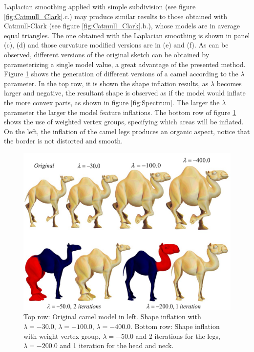 \documentclass[10pt, conference]{IEEEtran}
\begin{document}
Laplacian smoothing applied with simple subdivision (see figure \ref{fig:Catmull_Clark}.c.)
may produce similar results to those obtained with Catmull-Clark (see
figure \ref{fig:Catmull_Clark}.b.), whose models are in average equal
triangles. The one obtained with the Laplacian smoothing is shown
in panel (c), (d) and those curvature modified versions are in (e)
and (f). As can be observed, different versions of the original sketch
can be obtained by parameterizing a single model value, a great advantage
of the presented method. Figure \ref{fig:camello_enhanced} shows
the generation of different versions of a camel according to the $\lambda$
parameter. In the top row, it is shown the shape inflation results,
as $\lambda$ becomes larger and negative, the resultant shape is
observed as if the model would inflate the more convex parts, as shown
in figure \ref{fig:Spectrum}. The larger the $\lambda$ parameter
the larger the model feature inflations. The bottom row of figure
\ref{fig:camello_enhanced} shows the use of weighted vertex groups,
specifying which areas will be inflated. On the left, the inflation
of the camel legs produces an organic aspect, notice that the border
is not distorted and smooth.

\begin{figure}
\includegraphics[width=1\columnwidth]{figs/camello_enhanced2}

\caption{\label{fig:camello_enhanced}Top row: Original camel model in left.
Shape inflation with $\lambda=-30.0$, $\lambda=-100.0$, $\lambda=-400.0$.
Bottom row: Shape inflation with weight vertex group, $\lambda=-50.0$
and 2 iterations for the legs, $\lambda=-200.0$ and 1 iteration for
the head and neck.}
\end{figure}
\end{document}
